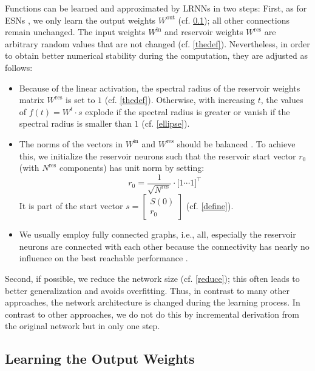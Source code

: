 \documentclass[twoside,11pt]{article}
\theoremstyle{definition}
\begin{document}
Functions can be learned and approximated by LRNNs in two steps: First, as for
ESNs \citep{JH04}, we only learn the output weights $W^\mathrm{out}$ (cf.
\cref{output}); all other connections remain unchanged. The input weights
$W^\mathrm{in}$ and reservoir weights $W^\mathrm{res}$ are arbitrary random
values that are not changed (cf. \cref{thedef}). Nevertheless, in order to
obtain better numerical stability during the computation, they are adjusted as
follows:
\begin{itemize}
  \item Because of the linear activation, the spectral radius of the reservoir
	weights matrix $W^\mathrm{res}$ is set to $1$ (cf. \cref{thedef}).
	Otherwise, with increasing $t$, the values of $f(t) = W^t \cdot s$
	explode if the spectral radius is greater or vanish if the spectral
	radius is smaller than $1$ (cf. \cref{ellipse}).
  \item The norms of the vectors in $W^\mathrm{in}$ and $W^\mathrm{res}$ should
        be balanced \citep{KLB12}. To achieve this, we initialize the reservoir
        neurons such that the reservoir start vector $r_0$ (with $N^\mathrm{res}$
        components) has unit norm by
        setting:
	\[ r_0 = \frac{1}{\sqrt{N^\mathrm{res}}} \cdot \big[ 1 \cdots 1 \big]^\top \]
	It is part of the start vector $s = \left[ \begin{array}{c} S(0) \\ r_0
	\end{array} \right]$ (cf. \cref{define}).
  \item We usually employ fully connected graphs, i.e., all, especially the
	reservoir neurons are connected with each other because the
	connectivity has nearly no influence on the best reachable performance
	\citep{KLB12}.
\end{itemize}
Second, if possible, we reduce the network size (cf. \cref{reduce});
this often leads to better generalization and avoids overfitting. Thus, in
contrast to many other approaches, the network architecture is changed during
the learning process. In contrast to other approaches, we do not do this by
incremental derivation from the original network but in only one step.

\subsection{Learning the Output Weights}\label{output}
\end{document}

